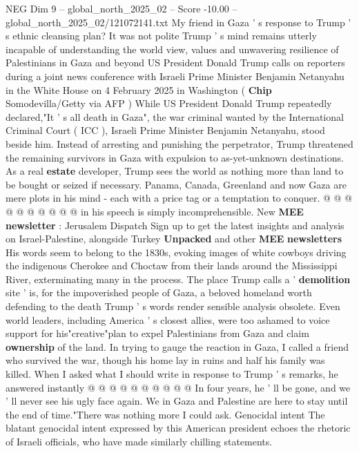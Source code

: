 \begin{textsample}{NEG Dim 9 – global\_north\_2025\_02 – Score -10.00 – global\_north\_2025\_02/121072141.txt}  \label{ex:f9_neg_001}
My friend in Gaza ' s response to Trump ' s ethnic cleansing plan?
It was not polite Trump ' s mind remains utterly incapable of understanding the world view, values and unwavering resilience of Palestinians in Gaza and beyond US President Donald Trump calls on reporters during a joint news conference with Israeli Prime Minister Benjamin Netanyahu in the White House on 4 February 2025 in Washington ( \textbf{Chip} Somodevilla/Getty via AFP ) While US President Donald Trump repeatedly declared,"It ' s all death in Gaza", the war criminal wanted by the International Criminal Court ( ICC ), Israeli Prime Minister Benjamin Netanyahu, stood beside him.
Instead of arresting and punishing the perpetrator, Trump threatened the remaining survivors in Gaza with expulsion to as-yet-unknown destinations.
As a real \textbf{estate} developer, Trump sees the world as nothing more than land to be bought or seized if necessary.
Panama, Canada, Greenland and now Gaza are mere plots in his mind - each with a price tag or a temptation to conquer. @ @ @ @ @ @ @ @ @ @ in his speech is simply incomprehensible.
New \textbf{MEE} \textbf{newsletter} : Jerusalem Dispatch Sign up to get the latest insights and analysis on Israel-Palestine, alongside Turkey \textbf{Unpacked} and other \textbf{MEE} \textbf{newsletters} His words seem to belong to the 1830s, evoking images of white cowboys driving the indigenous Cherokee and Choctaw from their lands around the Mississippi River, exterminating many in the process.
The place Trump calls a ' \textbf{demolition} site ' is, for the impoverished people of Gaza, a beloved homeland worth defending to the death Trump ' s words render sensible analysis obsolete.
Even world leaders, including America ' s closest allies, were too ashamed to voice support for his"creative"plan to expel Palestinians from Gaza and claim \textbf{ownership} of the land.
In trying to gauge the reaction in Gaza, I called a friend who survived the war, though his home lay in ruins and half his family was killed.
When I asked what I should write in response to Trump ' s remarks, he answered instantly @ @ @ @ @ @ @ @ @ @ In four years, he ' ll be gone, and we ' ll never see his ugly face again.
We in Gaza and Palestine are here to stay until the end of time."There was nothing more I could ask.
Genocidal intent The blatant genocidal intent expressed by this American president echoes the rhetoric of Israeli officials, who have made similarly chilling statements.

\end{textsample}
